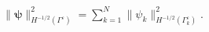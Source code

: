 \documentclass[]{article}
\numberwithin{equation}{section}
\numberwithin{theorem}{section}
\numberwithin{lemma}{section}
\numberwithin{corollary}{section}
\numberwithin{proposition}{section}
\numberwithin{definition}{section}
\newcommand{\re}{\varepsilon}
\renewcommand{\vec}{\boldsymbol}
\begin{document}
	\begin{align}
		\label{eq:Hminhalf}
		\begin{split}
			\| \vec{\psi} \|^2_{H^{-1/2}(\Gamma^{\re})} = \sum_{k=1}^{N} \| \psi_k \|^2_{H^{-1/2} (\Gamma^{\re}_k)}.
		\end{split}
	\end{align}	
	
\end{document}
